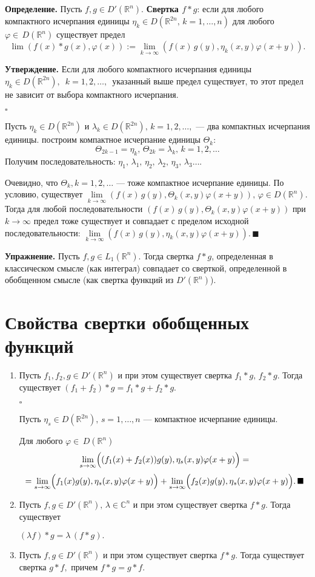 \documentclass[12pt,a4paper,draft]{article}
\DeclareRobustCommand*{\т}{~--- }
\DeclareRobustCommand*{\ч}{~-- }
\begin{document}
\textbf{Определение.} Пусть $f,g\in D'(\mathbb R^n).$
\textbf{Свертка $f*g$}: если для любого компактного исчерпания
единицы $\eta_k\in D(\mathbb R^{2n},\,k=1,\ldots,n)$ для любого
$\varphi\in\,D(\mathbb R^n)$ существует предел
$$\lim (f(x)*g(x),\varphi(x)):=\lim\limits_{k
\to\infty}(f(x)\,g(y),\eta_k(x,y)\varphi(x+y)).$$

\textbf{Утверждение.} Если для любого компактного исчерпания
единицы $\eta_k\in D(\mathbb R^{2n}),\,\,\,k=1,2,\ldots,\,$
указанный выше предел существует, то этот предел не зависит от
выбора компактного исчерпания.

$\square$

Пусть $\eta_k\in D(\mathbb R^{2n})$ и $\lambda_k\in D(\mathbb
R^{2n}),\,k=1,2,\ldots,$ --- два компактных исчерпания единицы.
построим компактное исчерпание единицы $\Theta_k$:
$$\Theta_{2k-1}=\eta_k,\,\Theta_{2k}=\lambda_k,\,k=1,2,\ldots$$
Получим последовательность:
$\eta_1,\,\lambda_1,\,\eta_2,\,\lambda_2,\,\eta_3,\,\lambda_3\ldots.$

Очевидно, что $\Theta_k, k=1,2,\ldots$ --- тоже компактное
исчерпание единицы. По условию, существует $\lim\limits_{k
\to\infty}(f(x)\,g(y),\Theta_k(x,y)\varphi(x+y)),\,\varphi\in
D(\mathbb R^n).$ Тогда для любой последовательности
$(f(x)\,g(y),\Theta_k(x,y)\varphi(x+y))$ при $k \to\infty$ предел
тоже существует и совпадает с пределом исходной
последовательности: $\lim\limits_{k
\to\infty}(f(x)\,g(y),\eta_k(x,y)\varphi(x+y)).\,\blacksquare$

\textbf{Упражнение.} Пусть $f,g\in L_1(\mathbb R^n).$ Тогда
свертка $f*g$, определенная в классическом смысле (как интеграл)
совпадает со сверткой, определенной в обобщенном смысле (как
свертка функций из $D'(\mathbb R^n)$).

\section{Свойства свертки обобщенных функций}

\begin{enumerate}
\item Пусть $f_1,f_2,g\in D'(\mathbb R^n)$ и при этом существует
свертка $f_1*g,\,f_2*g.$ Тогда существует
$(f_1+f_2)*g=f_1*g+f_2*g.$

$\square$

Пусть $\eta_s\in D(\mathbb R^{2n}),\,s=1,\ldots,n$ --- компактное
исчерпание единицы.

Для любого $\varphi\in\,D(\mathbb R^n)$
$$\lim\limits_{s\to\infty}\Bigl((f_1(x)+f_2(x))g(y),\eta_s(x,y)\varphi(x+y)\Bigr)=$$
$$=\lim\limits_{s\to\infty}\Bigl(f_1(x)g(y),\eta_s(x,y)\varphi(x+y)\Bigr)+
\lim\limits_{s\to\infty}\Bigl(f_2(x)g(y),\eta_s(x,y)\varphi(x+y)\Bigr).\,\blacksquare$$

\item Пусть $f,g\in D'(\mathbb R^n),\,\lambda\in\mathbb C^n$ и при этом существует
свертка $f*g.$ Тогда существует

$(\lambda f)*g=\lambda \,(f*g).$
\item Пусть $f,g\in D'(\mathbb R^n)$ и при этом существует
свертка $f*g.$ Тогда существует свертка $g*f,$ причем $f*g=g*f.$
\end{enumerate}
\end{document}

